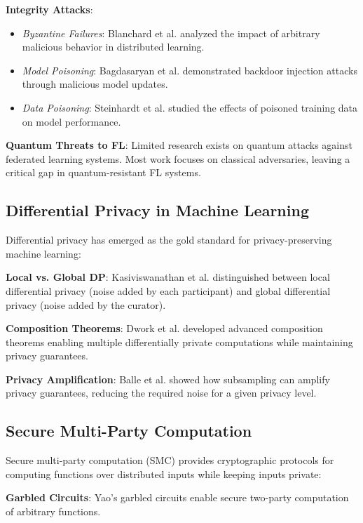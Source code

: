 \documentclass[journal,onecolumn,draftclsnofoot]{IEEEtran}
\begin{document}
\textbf{Integrity Attacks}:
\begin{itemize}
\item \textit{Byzantine Failures}: Blanchard et al. \cite{blanchard2017machine} analyzed the impact of arbitrary malicious behavior in distributed learning.
\item \textit{Model Poisoning}: Bagdasaryan et al. \cite{bagdasaryan2020backdoor} demonstrated backdoor injection attacks through malicious model updates.
\item \textit{Data Poisoning}: Steinhardt et al. \cite{steinhardt2017certified} studied the effects of poisoned training data on model performance.
\end{itemize}

\textbf{Quantum Threats to FL}: Limited research exists on quantum attacks against federated learning systems. Most work focuses on classical adversaries, leaving a critical gap in quantum-resistant FL systems.

\subsection{Differential Privacy in Machine Learning}

Differential privacy \cite{dwork2006calibrating} has emerged as the gold standard for privacy-preserving machine learning:

\textbf{Local vs. Global DP}: Kasiviswanathan et al. \cite{kasiviswanathan2011local} distinguished between local differential privacy (noise added by each participant) and global differential privacy (noise added by the curator).

\textbf{Composition Theorems}: Dwork et al. \cite{dwork2010boosting} developed advanced composition theorems enabling multiple differentially private computations while maintaining privacy guarantees.

\textbf{Privacy Amplification}: Balle et al. \cite{balle2018privacy} showed how subsampling can amplify privacy guarantees, reducing the required noise for a given privacy level.

\subsection{Secure Multi-Party Computation}

Secure multi-party computation (SMC) provides cryptographic protocols for computing functions over distributed inputs while keeping inputs private:

\textbf{Garbled Circuits}: Yao's garbled circuits \cite{yao1986generate} enable secure two-party computation of arbitrary functions.
\end{document}
